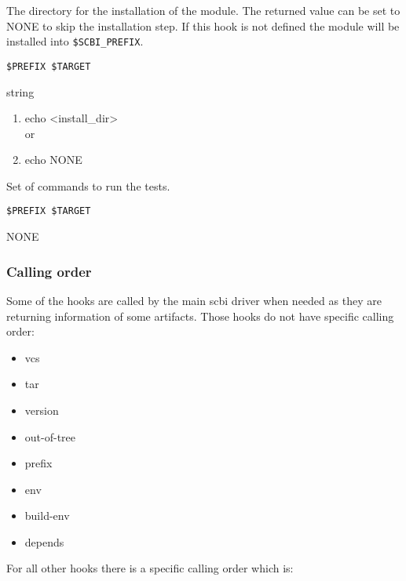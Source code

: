 \documentclass[a4paper,12pt,twoside]{article}
\newcommand{\code}[1]{\texttt{#1}}
\begin{document}
\begin{description}[font=\large\texttt]
	\item[<module>-prefix] The directory for the installation of the module. The returned value can be set to NONE to skip the installation step. If this hook is not defined the module will be installed into \code{\$SCBI\_PREFIX}.
	\label{global-install}
	\begin{description}[font=\textit,style=standard]
		\item[parameter] \tabto{2cm} \code{\$PREFIX \$TARGET}
		\item[return] \tabto{2cm} string
		\begin{enumerate}
			\item echo <install\_dir>
			\\ or
			\item echo NONE
		\end{enumerate}
	\end{description}

	\item[<module>-tests] Set of commands to run the tests.
	\begin{description}[font=\textit,style=standard]
		\item[parameter] \tabto{2cm} \code{\$PREFIX \$TARGET}
		\item[return] \tabto{2cm} NONE
	\end{description}

\end{description}

\subsubsection{Calling order}

Some of the hooks are called by the main scbi driver when needed as they are returning information of some artifacts. Those hooks do not have specific calling order:

\begin{itemize}
	\item vcs
	\item tar
	\item version
	\item out-of-tree
	\item prefix
	\item env
	\item build-env
	\item depends
\end{itemize}

For all other hooks there is a specific calling order which is:
\end{document}

